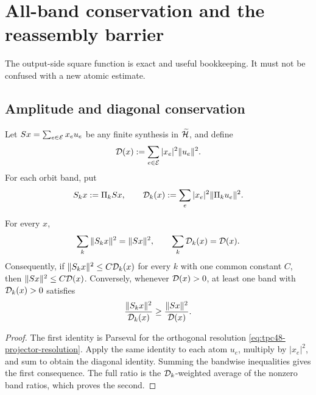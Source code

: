 \section{All-band conservation and the reassembly barrier}
\label{sec:tpc48-conservation}

The output-side square function is exact and useful bookkeeping.  It
must not be confused with a new atomic estimate.

\subsection{Amplitude and diagonal conservation}

Let \(Sx=\sum_{e\in\mathcal E}x_eu_e\) be any finite synthesis in
\(\widetilde{\mathcal H}\), and define
\begin{equation}
 \mathcal D(x):=\sum_{e\in\mathcal E}|x_e|^2\|u_e\|^2.
 \label{eq:tpc48-abstract-diagonal}
\end{equation}
For each orbit band, put
\begin{equation}
 S_kx:=\Pi_kSx,
 \qquad
 \mathcal D_k(x):=\sum_e|x_e|^2\|\Pi_ku_e\|^2.
 \label{eq:tpc48-band-diagonal}
\end{equation}

\begin{proposition}
\label{prop:tpc48-all-band-conservation}
For every \(x\),
\begin{equation}
 \sum_k\|S_kx\|^2=\|Sx\|^2,
 \qquad
 \sum_k\mathcal D_k(x)=\mathcal D(x).
 \label{eq:tpc48-all-band-conservation}
\end{equation}
Consequently, if
\(\|S_kx\|^2\le C\mathcal D_k(x)\) for every \(k\) with one common constant
       \(C\), then \(\|Sx\|^2\le C\mathcal D(x)\).  Conversely, whenever
\(\mathcal D(x)>0\), at least one band with \(\mathcal D_k(x)>0\) satisfies
\begin{equation}
 \frac{\|S_kx\|^2}{\mathcal D_k(x)}
 \ge\frac{\|Sx\|^2}{\mathcal D(x)}.
 \label{eq:tpc48-one-band-inherits-ratio}
\end{equation}
\end{proposition}

\begin{proof}
The first identity is Parseval for the orthogonal resolution
\eqref{eq:tpc48-projector-resolution}.  Apply the same identity to each
atom \(u_e\), multiply by \(|x_e|^2\), and sum to obtain the diagonal
identity.  Summing the bandwise inequalities gives the first
consequence.  The full ratio is the \(\mathcal D_k\)-weighted average of the
nonzero band ratios, which proves the second.
\end{proof}

